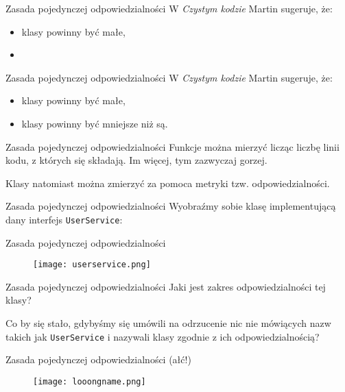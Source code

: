 \begin{frame}{Zasada pojedynczej odpowiedzialności}
	W \emph{Czystym kodzie} Martin sugeruje, że:
	\begin{itemize}
		\item klasy powinny być małe,
		\item
	\end{itemize}
\end{frame}

\begin{frame}{Zasada pojedynczej odpowiedzialności}
	W \emph{Czystym kodzie} Martin sugeruje, że:
	\begin{itemize}
		\item klasy powinny być małe,
		\item klasy powinny być mniejsze niż są.
	\end{itemize}
\end{frame}

\begin{frame}{Zasada pojedynczej odpowiedzialności}
	Funkcje można mierzyć licząc liczbę linii kodu, z których się składają. Im więcej, tym zazwyczaj gorzej.
	
	Klasy natomiast można zmierzyć za pomoca metryki tzw. odpowiedzialności. 
\end{frame}

\begin{frame}{Zasada pojedynczej odpowiedzialności}
	Wyobraźmy sobie klasę implementującą dany interfejs \texttt{UserService}:
\end{frame}

\begin{frame}{Zasada pojedynczej odpowiedzialności}
	\begin{figure}
		\centering
		\texttt{[image: userservice.png]}
	\end{figure}
\end{frame}

\begin{frame}{Zasada pojedynczej odpowiedzialności}
	Jaki jest zakres odpowiedzialności tej klasy?
	
	Co by się stało, gdybyśmy się umówili na odrzucenie nic nie mówiących nazw takich jak \texttt{UserService} i nazywali klasy zgodnie z ich odpowiedzialnością?
\end{frame}

\begin{frame}{Zasada pojedynczej odpowiedzialności (ałć!)}
	\begin{figure}
		\centering
		\texttt{[image: looongname.png]}
	\end{figure}
\end{frame}

